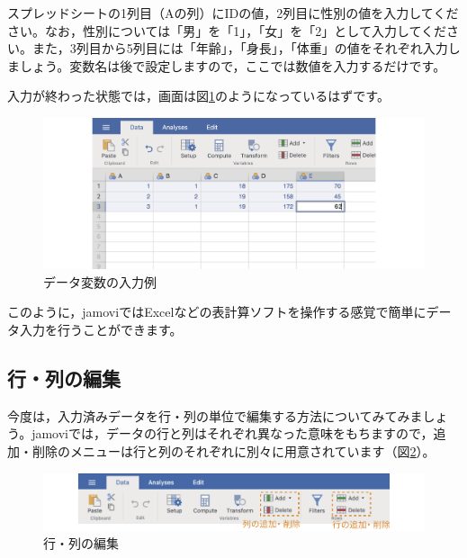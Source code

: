 \documentclass[
  12pt,
  a5jpaper,
  lualatex, ja=standard]{bxjsbook}
\begin{document}
スプレッドシートの1列目（Aの列）にIDの値，2列目に性別の値を入力してください。なお，性別については「男」を「1」，「女」を「2」として入力してください。また，3列目から5列目には「年齢」，「身長」，「体重」の値をそれぞれ入力しましょう。変数名は後で設定しますので，ここでは数値を入力するだけです。

入力が終わった状態では，画面は図\ref{fig:data-sample-data}のようになっているはずです。

\begin{figure}[!ht]

{\centering \includegraphics[width=1\linewidth]{images/basics/data-sample-data} 

}

\caption{データ変数の入力例}\label{fig:data-sample-data}
\end{figure}

このように，jamoviではExcelなどの表計算ソフトを操作する感覚で簡単にデータ入力を行うことができます。

\hypertarget{sub:basics-data-variable-row-edit}{%
\subsection{行・列の編集}\label{sub:basics-data-variable-row-edit}}

今度は，入力済みデータを行・列の単位で編集する方法についてみてみましょう。jamoviでは，データの行と列はそれぞれ異なった意味をもちますので，追加・削除のメニューは行と列のそれぞれに別々に用意されています（図\ref{fig:edit-row-col}）。

\begin{figure}[!ht]

{\centering \includegraphics[width=1\linewidth]{images/basics/edit-row-col} 

}

\caption{行・列の編集}\label{fig:edit-row-col}
\end{figure}
\end{document}
